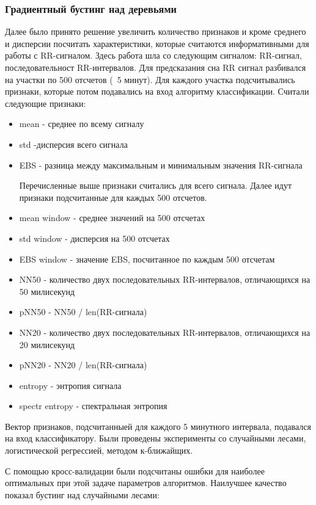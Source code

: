 \subsubsection{Градиентный бустинг над деревьями}
Далее было принято решение увеличить количество признаков и кроме среднего и дисперсии посчитать характеристики, которые считаются информативными для работы с RR-сигналом. Здесь работа шла со следующим сигналом: RR-сигнал, последовательност RR-интервалов. Для предсказания сна RR сигнал разбивался на участки по 500 отсчетов (~5 минут). Для каждого участка подсчитывались признаки, которые потом подавались на вход алгоритму классификации.
Считали следующие признаки:

\begin{itemize}
	\item mean - среднее по всему сигналу
	\item std -дисперсия всего сигнала
	\item EBS - разница между максимальным и минимальным значения RR-сигнала
	
	Перечисленные выше признаки считались для всего сигнала. Далее идут признаки подсчитанные для каждых 500 отсчетов.
	
	\item mean window - среднее значений на 500 отсчетах
	\item std window - дисперсия на 500 отсчетах
	\item EBS window - значение EBS, посчитанное по каждым 500 отсчетам
	\item NN50 - количество двух последовательных RR-интервалов, отличающихся на 50 милисекунд
	\item pNN50 - NN50 / len(RR-сигнала)
	\item NN20 - количество двух последовательных RR-интервалов, отличающихся на 20 милисекунд
	\item pNN20 - NN20 / len(RR-сигнала)
	\item entropy - энтропия сигнала
	\item spectr entropy - спектральная энтропия
\end{itemize}
Вектор признаков, подсчитанныей для каждого 5 минутного интервала, подавался на вход классификатору. Были проведены эксперименты со случайными лесами, логистической регрессией, методом к-ближайщих.

С помощью кросс-валидации были подсчитаны ошибки для наиболее оптимальных при этой задаче параметров алгоритмов.
Наилучшее качество показал бустинг над случайными лесами:

